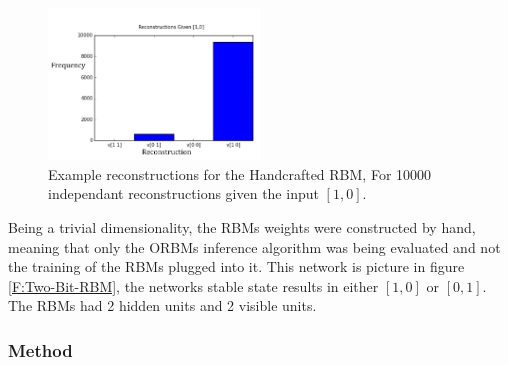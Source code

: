 \begin{figure}
  \begin{center}
    \includegraphics[width=0.5\textwidth]{Assets/Two-Bit-RBM-Recon.png}
  \end{center}
  \caption{Example reconstructions for the Handcrafted RBM, For 10000 independant reconstructions given the input $[1,0]$.}
  \label{F:Two-Bit-RBM-Recons}
\end{figure}

Being a trivial dimensionality, the RBMs weights were constructed by hand, meaning that only the ORBMs inference algorithm was being evaluated and not the training of the RBMs plugged into it. This network is picture in figure \ref{F:Two-Bit-RBM},  the networks stable state results in either $[1 , 0]$ or $[0 , 1]$. The RBMs had 2 hidden units and 2 visible units.

\subsubsection{Method}

